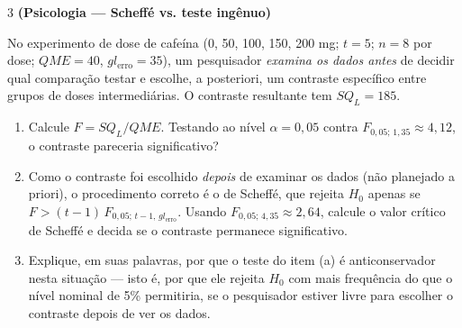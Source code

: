 \documentclass[11pt]{article}
\begin{document}
\begin{questao}{3} \textbf{(Psicologia --- Scheffé vs. teste ingênuo)}

No experimento de dose de cafeína (0, 50, 100, 150, 200 mg; $t=5$; $n=8$ por dose;
$QME = 40$, $gl_{\text{erro}} = 35$), um pesquisador \emph{examina os dados antes} de decidir
qual comparação testar e escolhe, a posteriori, um contraste específico entre grupos de doses
intermediárias. O contraste resultante tem $SQ_L = 185$.

\begin{enumerate}[label=(\alph*)]
  \item Calcule $F = SQ_L/QME$. Testando ao nível $\alpha = 0{,}05$ contra
    $F_{0{,}05;\,1,35} \approx 4{,}12$, o contraste pareceria significativo?
  \item Como o contraste foi escolhido \emph{depois} de examinar os dados (não planejado a
    priori), o procedimento correto é o de Scheffé, que rejeita $H_0$ apenas se
    $F > (t-1)\,F_{0{,}05;\,t-1,\,gl_{\text{erro}}}$. Usando $F_{0{,}05;\,4,35} \approx 2{,}64$,
    calcule o valor crítico de Scheffé e decida se o contraste permanece significativo.
  \item Explique, em suas palavras, por que o teste do item (a) é anticonservador nesta situação
    --- isto é, por que ele rejeita $H_0$ com mais frequência do que o nível nominal de 5\%
    permitiria, se o pesquisador estiver livre para escolher o contraste depois de ver os dados.
\end{enumerate}
\end{questao}
\end{document}

